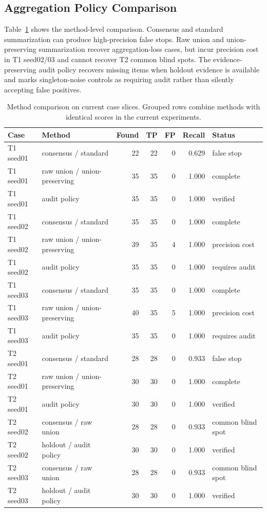 \documentclass[letterpaper]{article}
\begin{document}
\subsection{Aggregation Policy Comparison}

Table~\ref{tab:methods} shows the method-level comparison. Consensus and
standard summarization can produce high-precision false stops. Raw union and
union-preserving summarization recover aggregation-loss cases, but incur
precision cost in T1 seed02/03 and cannot recover T2 common blind spots. The
evidence-preserving audit policy recovers missing items when holdout evidence is
available and marks singleton-noise controls as requiring audit rather than
silently accepting false positives.

\begin{table}[t]
\centering
\small
\begin{tabular}{llrrrrl}
\toprule
Case & Method & Found & TP & FP & Recall & Status \\
\midrule
T1 seed01 & consensus / standard & 22 & 22 & 0 & 0.629 & false stop \\
T1 seed01 & raw union / union-preserving & 35 & 35 & 0 & 1.000 & complete \\
T1 seed01 & audit policy & 35 & 35 & 0 & 1.000 & verified \\
\midrule
T1 seed02 & consensus / standard & 35 & 35 & 0 & 1.000 & complete \\
T1 seed02 & raw union / union-preserving & 39 & 35 & 4 & 1.000 & precision cost \\
T1 seed02 & audit policy & 35 & 35 & 0 & 1.000 & requires audit \\
\midrule
T1 seed03 & consensus / standard & 35 & 35 & 0 & 1.000 & complete \\
T1 seed03 & raw union / union-preserving & 40 & 35 & 5 & 1.000 & precision cost \\
T1 seed03 & audit policy & 35 & 35 & 0 & 1.000 & requires audit \\
\midrule
T2 seed01 & consensus / standard & 28 & 28 & 0 & 0.933 & false stop \\
T2 seed01 & raw union / union-preserving & 30 & 30 & 0 & 1.000 & complete \\
T2 seed01 & audit policy & 30 & 30 & 0 & 1.000 & verified \\
\midrule
T2 seed02 & consensus / raw union & 28 & 28 & 0 & 0.933 & common blind spot \\
T2 seed02 & holdout / audit policy & 30 & 30 & 0 & 1.000 & verified \\
\midrule
T2 seed03 & consensus / raw union & 28 & 28 & 0 & 0.933 & common blind spot \\
T2 seed03 & holdout / audit policy & 30 & 30 & 0 & 1.000 & verified \\
\bottomrule
\end{tabular}
\caption{Method comparison on current case slices. Grouped rows combine methods
with identical scores in the current experiments.}
\label{tab:methods}
\end{table}
\end{document}
